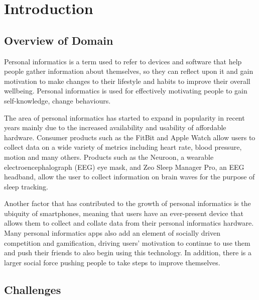 \section{Introduction}\label{sec:introduction}

\subsection{Overview of Domain}


Personal informatics is a term used to refer to devices and software that help people gather
information about themselves, so they can reflect upon it and gain motivation to make changes to
their lifestyle and habits to improve their overall wellbeing. Personal informatics is used for
effectively motivating people to gain self-knowledge, change behaviours. %

The area of personal informatics has started to expand in popularity in recent years mainly due to
the increased availability and usability of affordable hardware. Consumer products such as the
FitBit and Apple Watch allow users to collect data on a wide variety of metrics including heart
rate, blood pressure, motion and many others. Products such as the Neuroon, a wearable
electroencephalograph (EEG) eye mask, and Zeo Sleep Manager Pro, an EEG headband, allow the user to
collect information on brain waves for the purpose of sleep tracking.


Another factor that has contributed to the growth of personal informatics is the ubiquity of
smartphones, meaning that users have an ever-present device that allows them to collect and collate
data from their personal informatics hardware. Many personal informatics apps also add an element of
socially driven competition and gamification, driving users' motivation to continue to use them and
push their friends to also begin using this technology. In addition, there is a larger social force
pushing people to take steps to improve themselves. %


\subsection{Challenges}

